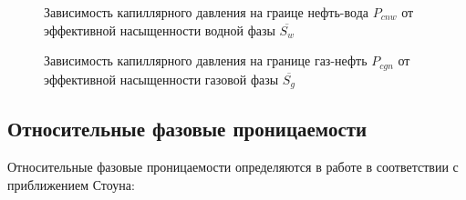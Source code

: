 \begin{figure}[h]
\begin{minipage}[h]{0.49\linewidth}
\caption{Зависимость капиллярного давления на граице нефть-вода
$P_{cnw}$ от эффективной насыщенности водной фазы $\overline{S_w}$}
\label{tikz_P_cnw}
\end{minipage}
\hfill
\begin{minipage}[h]{0.49\linewidth}
\caption{Зависимость капиллярного давления на границе газ-нефть 
$P_{cgn}$ от эффективной насыщенности газовой фазы $\overline{S_g}$}
\label{tikz_P_cgn}
\end{minipage}
\end{figure}

\subsection{Относительные фазовые проницаемости}
Относительные фазовые проницаемости определяются в работе в соответствии с
приближением Стоуна\cite{Aziz-Settari}:


